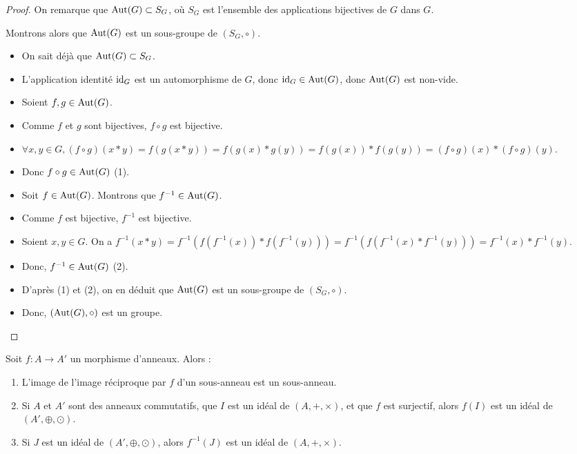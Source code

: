 \documentclass[12pt,a4paper]{report}
\begin{document}
\begin{proof}
    On remarque que $\mathrm{Aut}(G) \subset S_G$, où $S_G$ est l'ensemble des applications bijectives de $G$ dans $G$.

    Montrons alors que $\mathrm{Aut}(G)$ est un sous-groupe de $(S_G,\circ)$.

    \begin{itemize}
        \item On sait déjà que $\mathrm{Aut}(G) \subset S_G$.
        \item L'application identité $\mathrm{id}_G$ est un automorphisme de $G$, donc $\mathrm{id}_G \in \mathrm{Aut}(G)$, donc $\mathrm{Aut}(G)$ est non-vide.
        \item Soient $f,g \in \mathrm{Aut}(G)$.
        \item Comme $f$ et $g$ sont bijectives, $f \circ g$ est bijective.
        \item $\forall x,y \in G, (f \circ g)(x * y) = f(g(x * y)) = f(g(x) * g(y)) = f(g(x)) * f(g(y)) = (f \circ g)(x) * (f \circ g)(y)$.
        \item Donc $f \circ g \in \mathrm{Aut}(G)$ (1).
        \item Soit $f \in \mathrm{Aut}(G)$. Montrons que $f^{-1} \in \mathrm{Aut}(G)$.
        \item Comme $f$ est bijective, $f^{-1}$ est bijective.
        \item Soient $x,y \in G$. On a $f^{-1}(x * y) = f^{-1}(f(f^{-1}(x)) * f(f^{-1}(y))) = f^{-1}(f(f^{-1}(x) * f^{-1}(y))) = f^{-1}(x) * f^{-1}(y)$.
        \item Donc, $f^{-1} \in \mathrm{Aut}(G)$ (2).
        \item D'après (1) et (2), on en déduit que $\mathrm{Aut}(G)$ est un sous-groupe de $(S_G,\circ)$.
        \item Donc, $(\mathrm{Aut}(G),\circ)$ est un groupe.
    \end{itemize}
\end{proof}

\begin{property}
    Soit $f:A\to A'$ un morphisme d'anneaux. Alors :
    \begin{enumerate}
        \item L'image de l'image réciproque par $f$ d'un sous-anneau est un sous-anneau.
        \item Si $A$ et $A'$ sont des anneaux commutatifs, que $I$ est un idéal de $(A,+,\times)$, et que $f$ est surjectif, alors $f(I)$ est un idéal de $(A',\oplus,\odot)$.
        \item Si $J$ est un idéal de $(A',\oplus,\odot)$, alors $f^{-1}(J)$ est un idéal de $(A,+,\times)$.
    \end{enumerate}
\end{property}
\end{document}
